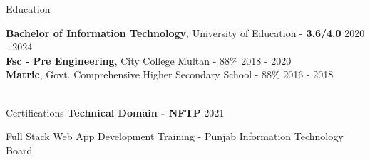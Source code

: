\documentclass{resume} %
\begin{document}
\begin{rSection}{Education}
	
	
	{\bf Bachelor of Information Technology}, University of Education - {\bf 3.6/4.0 }\hfill {2020 - 2024} 
	\\
	{\bf Fsc  - Pre Engineering}, City College Multan - 88\% \hfill {2018 - 2020}
	\\
	{\bf Matric}, Govt. Comprehensive Higher Secondary School - 88\% \hfill {2016 - 2018}  \\ \\
	
	
\end{rSection}

\begin{rSection}{Certifications} 
	\textbf{Technical Domain - NFTP} \hfill 2021 
    \item {Full Stack Web App Development Training - Punjab Information Technology
    Board}



\end{rSection}

\end{document}
